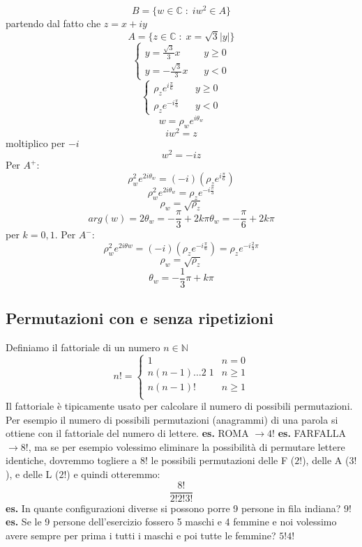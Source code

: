 \[
    B=\{w\in \mathbb{C} \;:\; i w^2 \in A\}
\] 
partendo dal fatto che $z=x+iy$
\[
    A = \{z\in \mathbb{C} \;:\; x = \sqrt{3}|y|\}
\] 
\[
    \begin{cases}
        y = \frac{\sqrt{3}}{3} x & \;  \;\; y \geq 0 \\
        y = -\frac{\sqrt{3}}{3} x & \;  \;\; y < 0
    \end{cases} 
\] 
\[
    \begin{cases}
        \rho_{z} e ^{i\frac{\pi}{6}} & \;  \;\; y \geq 0 \\
        \rho_{z} e ^{-i\frac{\pi}{6}} & \;  \;\; y < 0
    \end{cases} 
\] 
\[
    w = \rho_{w} e ^{i\theta_{w}}
\] 
\[
    iw^2 = z
\] 
moltiplico per $-i$
\[
    w^2 = -iz
\] 
Per $A^+$:
\[
    \rho_{w}^{2} e^{2i\theta_{w}} = (-i)(\rho_{z}e^{i\frac{\pi}{6}})
\]
\[
    \rho_{w}^2e^{2i\theta_{w}}= \rho_{z}e^{-i\frac{\pi}{3}}
\]
\[
    \rho_{w} =\sqrt{\rho_{z}}
\] 
\[
    arg(w) = 2\theta_{w} = -\frac{\pi}{3}+2k\pi \theta_{w} = -\frac{\pi}{6}+2k\pi
\]
per $k=0,1$.
\newline
Per $A^-$:
\[
    \rho_{w}^2e^{2i\theta w} = (-i)(\rho_{z}e^{-i\frac{\pi}{6}}) = \rho_{z}e^{-i\frac{2}{3}\pi}
\] 
\[
    \rho_{w} = \sqrt{\rho_{z}}
\] 
\[
    \theta_{w} = -\frac{1}{3}\pi + k\pi
\] 

\subsection*{Permutazioni con e senza ripetizioni}
Definiamo il fattoriale di un numero $n\in \mathbb{N}$
\[
    n! = \begin{cases}
        1 & n=0 \\
        n(n-1)\dots2\;1 &n\geq1 \\
        n(n-1)! &n\geq1 \\
    \end{cases} 
\]
Il fattoriale è tipicamente usato per calcolare il numero di possibili permutazioni. Per esempio il numero di possibili permutazioni (anagrammi) di una parola si ottiene con il fattoriale del numero di lettere.
\newline
\textbf{es.} ROMA $\rightarrow 4!$
\newline
\textbf{es.} FARFALLA $\rightarrow 8!$, ma se per esempio volessimo eliminare la possibilità di permutare lettere identiche, dovremmo togliere a $8!$ le possibili permutazioni delle F ($2!$), delle A ($3!$), e delle L ($2!$) e quindi otteremmo: 
\[
    \frac{8!}{2!2!3!}
\]
\newline
\textbf{es.} In quante configurazioni diverse si possono porre 9 persone in fila indiana? $9!$
\newline
\textbf{es.} Se le 9 persone dell'esercizio fossero 5 maschi e 4 femmine e noi volessimo avere sempre per prima i tutti i maschi e poi tutte le femmine? $5!4!$

